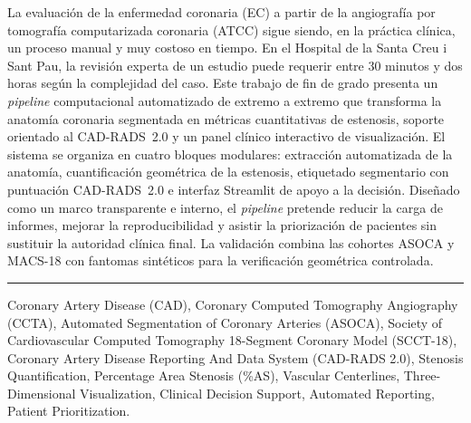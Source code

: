 \noindent
La evaluación de la enfermedad coronaria (EC) a partir de la angiografía por tomografía computarizada coronaria (ATCC) sigue siendo, en la práctica clínica, un proceso manual y muy costoso en tiempo. En el Hospital de la Santa Creu i Sant Pau, la revisión experta de un estudio puede requerir entre 30 minutos y dos horas según la complejidad del caso. Este trabajo de fin de grado presenta un \emph{pipeline} computacional automatizado de extremo a extremo que transforma la anatomía coronaria segmentada en métricas cuantitativas de estenosis, soporte orientado al CAD-RADS~2.0 y un panel clínico interactivo de visualización. El sistema se organiza en cuatro bloques modulares: extracción automatizada de la anatomía, cuantificación geométrica de la estenosis, etiquetado segmentario con puntuación CAD-RADS~2.0 e interfaz Streamlit de apoyo a la decisión. Diseñado como un marco transparente e interno, el \emph{pipeline} pretende reducir la carga de informes, mejorar la reproducibilidad y asistir la priorización de pacientes sin sustituir la autoridad clínica final. La validación combina las cohortes ASOCA y MACS-18 con fantomas sintéticos para la verificación geométrica controlada.
\par
\addvspace{2em}
\noindent\rule{\linewidth}{0.4pt}
\par
\addvspace{2em}

\noindent
Coronary Artery Disease (CAD), Coronary Computed Tomography Angiography (CCTA), Automated Segmentation of Coronary Arteries (ASOCA), Society of Cardiovascular Computed Tomography 18-Segment Coronary Model (SCCT-18), Coronary Artery Disease Reporting And Data System (CAD-RADS 2.0), Stenosis Quantification, Percentage Area Stenosis (\%AS), Vascular Centerlines, Three-Dimensional Visualization, Clinical Decision Support, Automated Reporting, Patient Prioritization.
